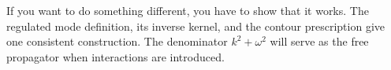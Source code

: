 
If you want to do something different, you have to show that it works.  The
regulated mode definition, its inverse kernel, and the contour prescription
give one consistent construction.  The denominator $k^2+\omega^2$ will serve
as the free propagator when interactions are introduced.

